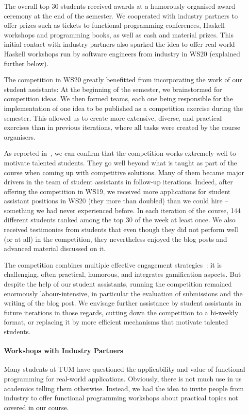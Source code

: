 The overall top 30 students received awards at
a humorously organised award ceremony at the end of the semester.
We cooperated with industry partners
to offer prizes such as tickets to functional programming conferences,
Haskell workshops and programming books, as well as cash and material prizes.
This initial contact with industry partners
also sparked the idea to offer real-world Haskell workshops
run by software engineers from industry in WS20 (explained further below).

The competition in WS20 greatly benefitted from incorporating the work of our student assistants:
At the beginning of the semester,
we brainstormed for competition ideas.
We then formed teams, each one being responsible for the
implementation of one idea to be published as a competition exercise during the semester.
This allowed us to create more extensive, diverse,
and practical exercises than in previous iterations,
where all tasks were created by the course organisers.

As reported in~\cite{next_1100},
we can confirm that the competition works extremely well to motivate talented students.
They go well beyond what is taught as part of the course when coming up with competitive solutions.
Many of them became major drivers in
the team of student assistants in follow-up iterations.
Indeed, after offering the competition in WS19,
we received more applications for student assistant positions in WS20 (they more than doubled) than we could hire -- something we had never experienced before.
In each iteration of the course, 144 different students ranked among the top 30 of the week at least once.
We also received testimonies from students that even though they did not perform well (or at all) in the competition,
they nevertheless enjoyed the blog posts and advanced material discussed on it.

The competition combines multiple effective
engagement strategies~\cite{onlineengagement5,engagementproposals}:
it is challenging, often practical, humorous,
and integrates gamification aspects.
But despite the help of our student assistants,
running the competition remained enormously labour-intensive,
in particular the evaluation of submissions and
the writing of the blog post.
We envisage further assistance by student assistants in future iterations in those regards,
cutting down the competition to a bi-weekly format,
or replacing it by more efficient mechanisms that motivate talented students.

\paragraph{Workshops with Industry Partners}
Many students at TUM have questioned the applicability and value of functional programming for real-world applications.
Obviously, there is not much use in us academics telling
them otherwise.
Instead, we had the idea to invite people from industry
to offer functional programming workshops about
practical topics not covered in our course.

